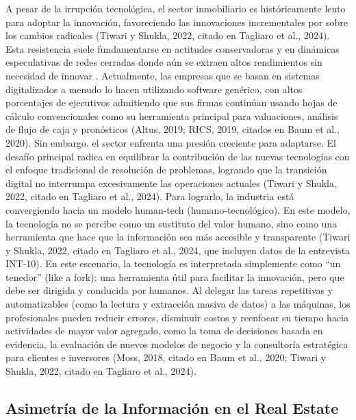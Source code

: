 A pesar de la irrupción tecnológica, el sector inmobiliario es históricamente lento para adoptar la innovación, favoreciendo las innovaciones incrementales por sobre los cambios radicales (Tiwari y Shukla, 2022, citado en Tagliaro et al., 2024). Esta resistencia suele fundamentarse en actitudes conservadoras y en dinámicas especulativas de redes cerradas donde aún se extraen altos rendimientos sin necesidad de innovar \parencite{SiniakEtAl2020}. Actualmente, las empresas que se basan en sistemas digitalizados a menudo lo hacen utilizando software genérico, con altos porcentajes de ejecutivos admitiendo que sus firmas continúan usando hojas de cálculo convencionales como su herramienta principal para valuaciones, análisis de flujo de caja y pronósticos (Altus, 2019; RICS, 2019, citados en Baum et al., 2020). Sin embargo, el sector enfrenta una presión creciente para adaptarse. El desafío principal radica en equilibrar la contribución de las nuevas tecnologías con el enfoque tradicional de resolución de problemas, logrando que la transición digital no interrumpa excesivamente las operaciones actuales (Tiwari y Shukla, 2022, citado en Tagliaro et al., 2024). Para lograrlo, la industria está convergiendo hacia un modelo human-tech (humano-tecnológico). En este modelo, la tecnología no se percibe como un sustituto del valor humano, sino como una herramienta que hace que la información sea más accesible y transparente (Tiwari y Shukla, 2022, citado en Tagliaro et al., 2024, que incluyen datos de la entrevista INT-10). En este escenario, la tecnología es interpretada simplemente como ``un tenedor'' (like a fork): una herramienta útil para facilitar la innovación, pero que debe ser dirigida y conducida por humanos. Al delegar las tareas repetitivas y automatizables (como la lectura y extracción masiva de datos) a las máquinas, los profesionales pueden reducir errores, disminuir costos y reenfocar su tiempo hacia actividades de mayor valor agregado, como la toma de decisiones basada en evidencia, la evaluación de nuevos modelos de negocio y la consultoría estratégica para clientes e inversores (Moss, 2018, citado en Baum et al., 2020; Tiwari y Shukla, 2022, citado en Tagliaro et al., 2024).

\subsection{Asimetría de la Información en el Real Estate}

